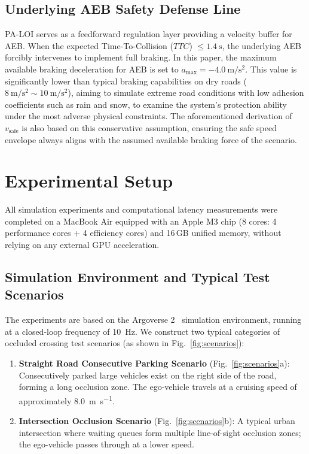 \documentclass[letterpaper, 10 pt, conference]{ieeeconf}  %
\begin{document}
\subsection{Underlying AEB Safety Defense Line}
PA-LOI serves as a feedforward regulation layer providing a velocity buffer for AEB. When the expected Time-To-Collision ($TTC$) $\leq \SI{1.4}{\second}$, the underlying AEB forcibly intervenes to implement full braking. In this paper, the maximum available braking deceleration for AEB is set to $a_{\text{max}} = \SI{-4.0}{\meter\per\second\squared}$. This value is significantly lower than typical braking capabilities on dry roads ($\SI{8}{\meter\per\second\squared}\sim\SI{10}{\meter\per\second\squared}$), aiming to simulate extreme road conditions with low adhesion coefficients such as rain and snow, to examine the system's protection ability under the most adverse physical constraints. The aforementioned derivation of $v_{\text{safe}}$ is also based on this conservative assumption, ensuring the safe speed envelope always aligns with the assumed available braking force of the scenario.

\section{Experimental Setup}

All simulation experiments and computational latency measurements were completed on a MacBook Air equipped with an Apple M3 chip (8 cores: 4 performance cores + 4 efficiency cores) and 16\,GB unified memory, without relying on any external GPU acceleration.

\subsection{Simulation Environment and Typical Test Scenarios}
The experiments are based on the Argoverse 2~\cite{argoverse2} simulation environment, running at a closed-loop frequency of \SI{10}{\hertz}. We construct two typical categories of occluded crossing test scenarios (as shown in Fig.~\ref{fig:scenarios}):
\begin{enumerate}
    \item \textbf{Straight Road Consecutive Parking Scenario} (Fig.~\ref{fig:scenarios}a): Consecutively parked large vehicles exist on the right side of the road, forming a long occlusion zone. The ego-vehicle travels at a cruising speed of approximately \SI{8.0}{\meter\per\second}.
    \item \textbf{Intersection Occlusion Scenario} (Fig.~\ref{fig:scenarios}b): A typical urban intersection where waiting queues form multiple line-of-sight occlusion zones; the ego-vehicle passes through at a lower speed.
\end{enumerate}
\end{document}
